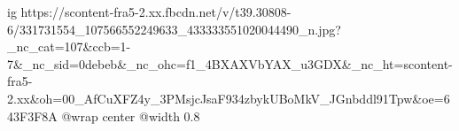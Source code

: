 
 
 
 
 

\ifcmt
  ig https://scontent-fra5-2.xx.fbcdn.net/v/t39.30808-6/331731554_107566552249633_433333551020044490_n.jpg?_nc_cat=107&ccb=1-7&_nc_sid=0debeb&_nc_ohc=f1_4BXAXVbYAX_u3GDX&_nc_ht=scontent-fra5-2.xx&oh=00_AfCuXFZ4y_3PMsjcJsaF934zbykUBoMkV_JGnbddl91Tpw&oe=643F3F8A
  @wrap center
  @width 0.8
\fi
